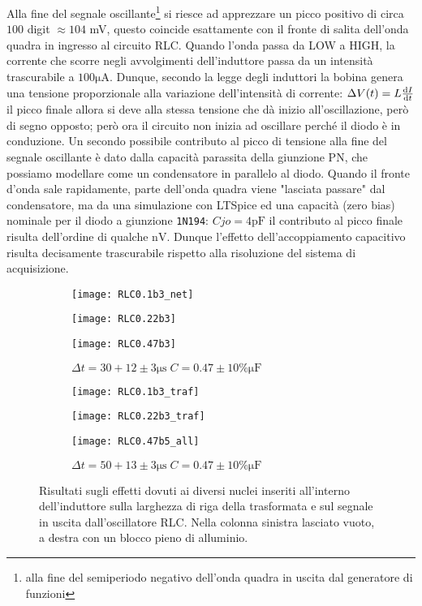 \documentclass{article}[a4paper, oneside, 11pt]
\begin{document}
Alla fine del segnale oscillante\footnote{alla fine del
semiperiodo negativo dell'onda quadra in uscita dal generatore di funzioni}
si riesce ad apprezzare un picco positivo di circa $100$ digit $\approx 104$ mV,
questo coincide esattamente con il fronte di salita dell'onda quadra in
ingresso al circuito RLC.
Quando l'onda passa da LOW a HIGH, la corrente che scorre negli avvolgimenti
dell'induttore passa da un intensità trascurabile a $100 \si{\micro\A}$.
Dunque, secondo la legge degli induttori la bobina genera una tensione
proporzionale alla variazione dell'intensità di corrente:
$\Delta V(t) = L \frac{\mathrm{d} I}{\mathrm{d} t}$
il picco finale allora si deve alla stessa tensione che dà inizio
all'oscillazione, però di segno opposto; però ora il circuito non inizia
ad oscillare perché il diodo è in conduzione.
Un secondo possibile contributo al picco di tensione alla
fine del segnale oscillante è dato dalla capacità parassita
della giunzione PN, che possiamo  modellare come un condensatore
in parallelo al diodo. Quando il fronte d'onda sale rapidamente, parte
dell'onda quadra viene "lasciata passare" dal condensatore, ma da 
una simulazione con LTSpice ed una capacità (zero bias) nominale per
il diodo a giunzione \texttt{1N194}: $Cjo = 4 \si{\pico\farad}$
il contributo al picco finale risulta dell'ordine di qualche $\si{\nano\V}$.
Dunque l'effetto dell'accoppiamento capacitivo risulta decisamente trascurabile
rispetto alla risoluzione del sistema di acquisizione.
\begin{figure}[!htb]
\centering
	\begin{subfigure}{.5\textwidth}
		\texttt{[image: RLC0.1b3\_net]} 
	\caption{$\Delta t = 30 + 13 \pm 2 \si{\micro\s} \; C = 0.1
			\pm 10 \% \si{\micro\F}$}
		\texttt{[image: RLC0.22b3]} 
	\caption{$\Delta t = 30 + 12 \pm 3 \si{\micro\s} \; C = 0.22 
			\pm 10 \% \si{\micro\F}$}
		\texttt{[image: RLC0.47b3]} 
	\caption{$\Delta t = 30 + 12 \pm 3 \si{\micro\s} \; C = 0.47
			\pm 10 \% \si{\micro\F}$}
	\end{subfigure}%
	\begin{subfigure}{.5\textwidth}
		\texttt{[image: RLC0.1b3\_traf]}
	\caption{$\Delta t = 30 + 12 \pm 3 \si{\micro\s} \; C = 0.1
			\pm 10 \% \si{\micro\F}$}
		\texttt{[image: RLC0.22b3\_traf]}
	\caption{$\Delta t = 30 + 12 \pm 3 \si{\micro\s} \; C = 0.22
			\pm 10\% \si{\micro\F}$}
		\texttt{[image: RLC0.47b5\_all]}
	\caption{$\Delta t = 50 + 13 \pm 3 \si{\micro\s} \; C = 0.47
			\pm 10 \% \si{\micro\F}$}
	\end{subfigure}%
	\caption{Risultati sugli effetti dovuti ai diversi nuclei inseriti
			all'interno dell'induttore sulla larghezza di riga della trasformata
			e sul segnale in uscita dall'oscillatore RLC. Nella colonna sinistra
			lasciato vuoto, a destra con un blocco pieno di alluminio.
			 \label{fig: RLCall}}
\end{figure}
\end{document}
